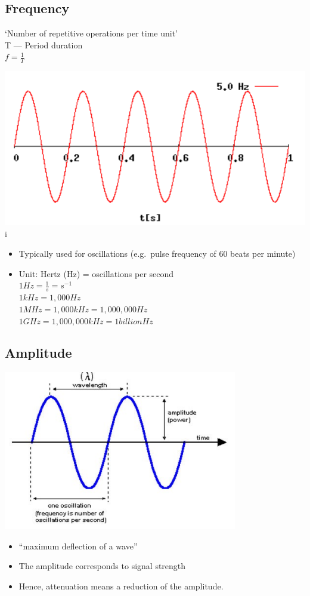 \documentclass[11pt]{article}
\begin{document}
\subsection{Frequency}
`Number of repetitive operations per time unit' \\
T --- Period duration \\
\(  f = \frac{1}{T} \)

\includegraphics[width=\textwidth]{frequency}i
\begin{itemize}
    \item Typically used for oscillations (e.g.\ pulse frequency of 60 beats per minute)
    \item Unit: Hertz (Hz) = oscillations per second \\
    \(  1 Hz = \frac{1}{s} = s^{-1} \) \\
    \(  1 kHz = 1,000 Hz \) \\
    \(  1 MHz  = 1,000 kHz = 1,000,000 Hz \) \\
    \(  1 GHz  = 1,000,000 kHz = 1 billion Hz \)
\end{itemize}
\subsection{Amplitude}
\includegraphics[width=\textwidth]{amplitude}
\begin{itemize}
    \item “maximum deflection of a wave”
    \item The amplitude corresponds to signal strength
    \item Hence, attenuation means a reduction of the amplitude.
\end{itemize}
\end{document}
